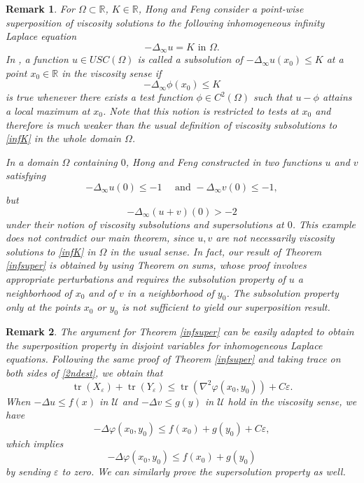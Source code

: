 \documentclass[12pt, reqno]{amsart}
\newtheorem{remark}{Remark}%
\newcommand{\R}{\mathbb{R}}
\newcommand{\red}[1]{\textcolor{red}{#1}}
\def\Om{\Omega}
\def\R{{\mathbb R}}
\def\U{{\mathcal U}}
\DeclareMathOperator{\tr}{tr}
\begin{document}


\begin{remark} 
 For $\Om\subset \R$, $K\in \R$, Hong and Feng \cite{HF} consider a point-wise superposition of viscosity solutions to the following inhomogeneous infinity Laplace equation
\begin{equation}\label{infK}
-\Delta_\infty u=K \text{ in $\Om$}.
\end{equation}
In \cite[Definition 1]{HF}, a function $u\in USC(\Om)$ is called a subsolution of $-\Delta_\infty u(x_0)\le K$ at a point $x_0\in \R$ in the viscosity sense if \[ -\Delta_\infty \phi (x_0)\le K \] is true whenever there exists a test function $\phi\in C^2(\Om)$ such that $u-\phi$ attains a local maximum at $x_0$. Note that this notion is restricted to tests at $x_0$ and therefore is much weaker than the usual definition %
of viscosity subsolutions to \eqref{infK} in the whole domain $\Om$. %

In a domain $\Om$ containing $0$, Hong and Feng constructed in \cite[Section 3]{HF} two functions $u$ and $v$ satisfying
\[
-\Delta_\infty u(0)\le -1 \quad \text{ and } -\Delta_\infty v(0)\le -1,
\]
but 
\[
-\Delta_\infty (u+v)(0) > -2 %
\]
under their notion of viscosity subsolutions and supersolutions at $0$. This example does not contradict our main theorem, since $u,v$ are not necessarily viscosity solutions to \eqref{infK} in $\Om$ in the usual sense. In fact, our result of Theorem \ref{infsuper} is obtained by using Theorem on sums, whose proof involves appropriate perturbations and requires the subsolution property of $u$ a neighborhood of $x_0$ and of $v$ in a neighborhood of $y_0$. The subsolution property only at the points $x_0$ or $y_0$ is not sufficient to yield our superposition result. 
\end{remark}

\begin{remark}\label{Lsuperdis}
    The argument for Theorem \ref{infsuper} can be easily adapted to obtain the superposition property in disjoint variables for inhomogeneous Laplace equations. Following the same proof of Theorem \ref{infsuper}  and taking trace on both sides of \eqref{2ndest}, we obtain that
    \[
\tr(X_\varepsilon)+\tr(Y_\varepsilon)\le \tr(\nabla^2\varphi(x_0,y_0))+C\varepsilon.
    \]
When $-\Delta u\leq f(x)$ in $\U$ and $-\Delta v\leq g(y)$ in $\U$ hold in the viscosity sense, we have
\[
-\Delta\varphi(x_0,y_0)\le f(x_0)+g(y_0)+C\varepsilon,
    \]
which implies 
 \[
-\Delta\varphi(x_0,y_0)\le f(x_0)+g(y_0)
    \]
    by sending $\varepsilon$ to zero. We can similarly prove the supersolution property as well. 
\end{remark}
\end{document}
